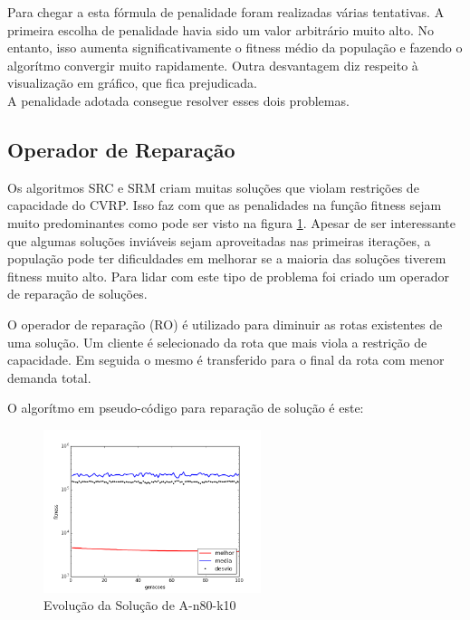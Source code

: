 \documentclass[conference]{IEEEtran}
\begin{document}
Para chegar a esta fórmula de penalidade foram realizadas várias tentativas. A primeira escolha de penalidade havia sido um valor arbitrário muito alto. No entanto, isso aumenta significativamente o fitness médio da população e fazendo o algorítmo convergir muito rapidamente. Outra desvantagem diz respeito à visualização em gráfico, que fica prejudicada. \\

A penalidade adotada consegue resolver esses dois problemas.\\

\subsection{Operador de Reparação}
Os algoritmos SRC e SRM criam muitas soluções que violam restrições de capacidade do CVRP. Isso faz com que as penalidades na função fitness sejam muito predominantes como pode ser visto na figura \ref{fig_A-n80-k10}. Apesar de ser interessante que algumas soluções inviáveis sejam aproveitadas nas primeiras iterações, a população pode ter dificuldades em melhorar se a maioria das soluções tiverem fitness muito alto. Para lidar com este tipo de problema foi criado um operador de reparação de soluções.

O operador de reparação (RO) é utilizado para diminuir as rotas existentes de uma solução. Um cliente é selecionado da rota que mais viola a restrição de capacidade. Em seguida o mesmo é transferido para o final da rota com menor demanda total.


O algorítmo em pseudo-código para reparação de solução é este:

\begin{figure}[!t]
\centering
\includegraphics[width=2.5in]{A-n80-k10}
\caption{Evolução da Solução de A-n80-k10}
\label{fig_A-n80-k10}
\end{figure}
\end{document}
